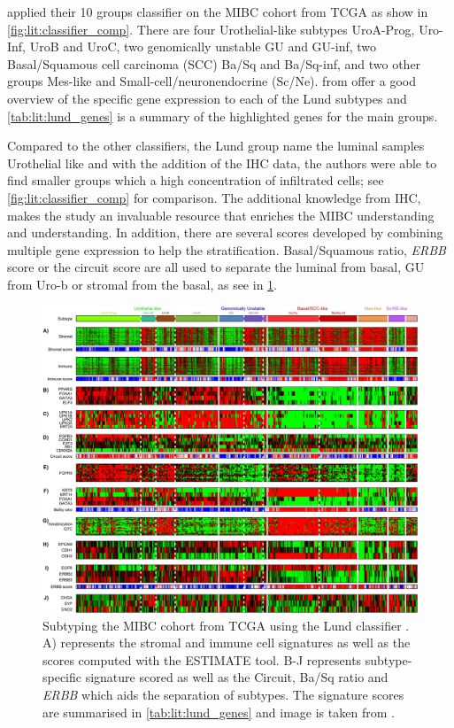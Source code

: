 \citet{Marzouka2018-ge} applied their 10 groups classifier on the MIBC cohort from TCGA as show in \cref{fig:lit:classifier_comp}. There are four Urothelial-like subtypes UroA-Prog, Uro-Inf, UroB and UroC, two genomically unstable GU and GU-inf, two Basal/Squamous cell carcinoma (SCC) Ba/Sq and Ba/Sq-inf, and two other groups Mes-like and Small-cell/neuronendocrine (Sc/Ne).  from \citet{Marzouka2018-ge} offer a good overview of the specific gene expression to each of the Lund subtypes and \cref{tab:lit:lund_genes} is a summary of the highlighted genes for the main groups.


Compared to the other classifiers, the Lund group name the luminal samples Urothelial like and with the addition of the IHC data, the authors were able to find smaller groups which a high concentration of infiltrated cells; see \cref{fig:lit:classifier_comp} for comparison. The additional knowledge from IHC, makes the study an invaluable resource that enriches the MIBC understanding and understanding. In addition, there are several scores developed by combining multiple gene expression to help the stratification. Basal/Squamous ratio, \textit{ERBB} score or the circuit score are all used to separate the luminal from basal, GU from Uro-b or stromal from the basal, as see in \cref{fig:lit:lund_fig}.


\begin{figure}[!htb]   
\centering
\includegraphics[width=1.0\textwidth,height=1.0\textheight,keepaspectratio]{Sections/Lit_review/Resources/Lung_subtypes.jpg}
  \caption{Subtyping the MIBC cohort from TCGA using the Lund classifier \cite{Marzouka2018-ge}. A) represents the stromal and immune cell signatures as well as the scores computed with the ESTIMATE tool\cite{Yoshihara2013-wq}. B-J represents subtype-specific signature scored as well as the Circuit, Ba/Sq ratio and \textit{ERBB} which aids the separation of subtypes. The signature scores are summarised in \cref{tab:lit:lund_genes} and image is taken from \cite{Marzouka2018-ge}.
}
\label{fig:lit:lund_fig}
\end{figure}
\FloatBarrier



